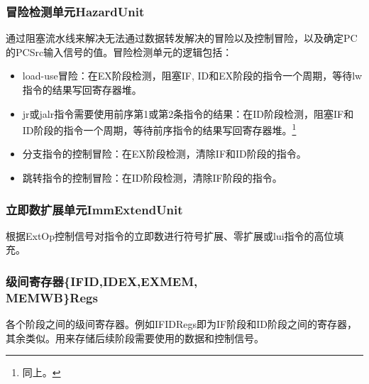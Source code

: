 \subsubsection{冒险检测单元HazardUnit}
通过阻塞流水线来解决无法通过数据转发解决的冒险以及控制冒险，以及确定PC的PCSrc输入信号的值。冒险检测单元的逻辑包括：
\begin{itemize}
    \item load-use冒险：在EX阶段检测，阻塞IF, ID和EX阶段的指令一个周期，等待lw指令的结果写回寄存器堆。
    \item jr或jalr指令需要使用前序第1或第2条指令的结果：在ID阶段检测，阻塞IF和ID阶段的指令一个周期，等待前序指令的结果写回寄存器堆。\footnote{同上。}
    \item 分支指令的控制冒险：在EX阶段检测，清除IF和ID阶段的指令。
    \item 跳转指令的控制冒险：在ID阶段检测，清除IF阶段的指令。
\end{itemize}

\subsubsection{立即数扩展单元ImmExtendUnit}
根据ExtOp控制信号对指令的立即数进行符号扩展、零扩展或lui指令的高位填充。

\subsubsection{级间寄存器\{IFID,IDEX,EXMEM,\\MEMWB\}Regs}
各个阶段之间的级间寄存器。例如IFIDRegs即为IF阶段和ID阶段之间的寄存器，其余类似。用来存储后续阶段需要使用的数据和控制信号。
